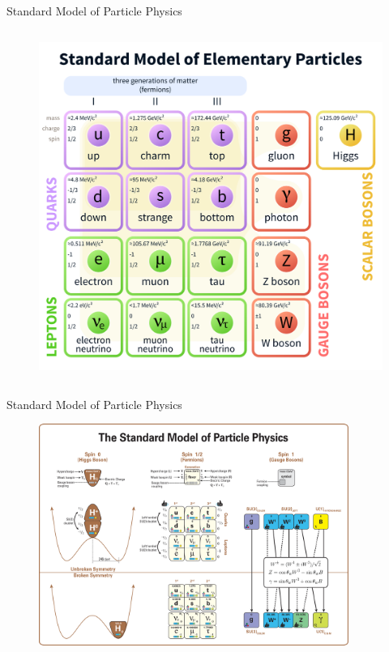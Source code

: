 \documentclass[10pt]{beamer}
\begin{document}
\begin{frame}{Standard Model of Particle Physics}
\begin{columns}
\begin{column}{0.6\textwidth}
\begin{figure}
                \includegraphics[scale=0.14]{figures/Standard_Model_of_Elementary_Particles.png}
            \end{figure}
        \end{column}
    \end{columns}
\end{frame}

\begin{frame}{Standard Model of Particle Physics}
    \begin{figure}
        \includegraphics[width=0.9\textwidth]{figures/Standard_Model_Of_Particle_Physics--Most_Complete_Diagram.png}
    \end{figure}
\end{frame}
\end{document}
